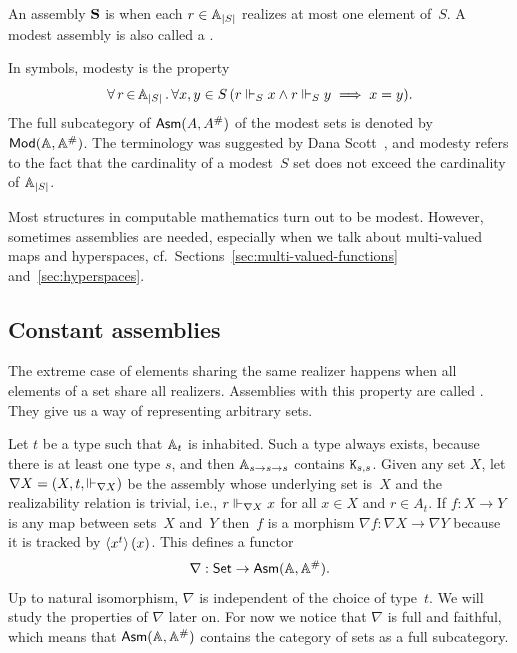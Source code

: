 \begin{definition}
  An assembly $\mathbf{S}$ is  when each $r \in \mathbb{A}_{|S|}$
  realizes at most one element of~$S$. A modest assembly is also
  called a .
\end{definition}

\noindent
In symbols, modesty is the property
%
\begin{equation*}
  \forall\, r \,{\in}\, \mathbb{A}_{|S|}\,.\,
    \forall x,y \in S \,
      (r \Vdash_S x \land r \Vdash_S y \implies x = y)
 .
\end{equation*}
%
The full subcategory of $\mathsf{Asm}(A,A^{\#})$ of the modest sets is
denoted by~$\mathsf{Mod}(\mathbb{A}, \mathbb{A}^{\#})$. The terminology was suggested by Dana
Scott~, and modesty refers to the fact that
the cardinality of a modest~$S$ set does not exceed the cardinality of
$\mathbb{A}_{|S|}$.

Most structures in computable mathematics turn out to be modest.
However, sometimes assemblies are needed, especially when we talk
about multi-valued maps and hyperspaces,
cf.~Sections~\ref{sec:multi-valued-functions}
and~\ref{sec:hyperspaces}.


\subsection{Constant assemblies}
\label{sec:nabla}

The extreme case of elements sharing the same realizer happens when
all elements of a set share all realizers. Assemblies with this
property are called . They give us a way of
representing arbitrary sets.

Let $t$ be a type such that $\mathbb{A}_{t}$ is inhabited. Such a type
always exists, because there is at least one type $s$, and then
$\mathbb{A}_{s \to s \to s}$ contains $\mathtt{K}_{s,s}$. Given any set $X$, let
$\nabla X = (X, t, {\Vdash_{\nabla X}})$ be the assembly whose underlying
set is~$X$ and the realizability relation is trivial, i.e., $r
\Vdash_{\nabla X} x$ for all $x \in X$ and $r \in A_t$. If $f : X \to Y$
is any map between sets~$X$ and~$Y$ then~$f$ is a morphism $\nabla f :
\nabla X \to \nabla Y$ because it is tracked by
$\langle x^{t} \rangle\,(x)$. This defines a functor
%
\begin{equation*}
  \nabla : \mathsf{Set} \to \mathsf{Asm}(\mathbb{A},\mathbb{A}^{\#}).
\end{equation*}
%
Up to natural isomorphism, $\nabla$ is independent of the choice of
type~$t$. We will study the properties of $\nabla$ later on. For now
we notice that $\nabla$ is full and faithful, which means that
$\mathsf{Asm}(\mathbb{A},\mathbb{A}^{\#})$ contains the category of sets as a full
subcategory.

